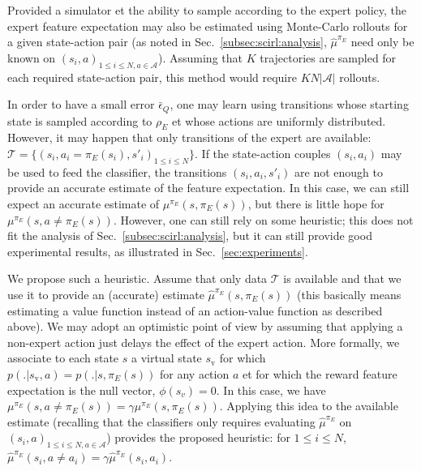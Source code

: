 \documentclass[english,utf8]{./hermes-journal}
\newcommand{\A}{\mathcal{A}}
\newcommand{\T}{\mathcal{T}}
\begin{document}
%
Provided a simulator et the ability to sample according to the
expert policy, the expert feature expectation may also be estimated
using Monte-Carlo rollouts for a given state-action pair (as noted
in Sec.~\ref{subsec:scirl:analysis}, $\hat{\mu}^{\pi_E}$ need only
be known on $(s_i,a)_{1\leq i\leq N,a\in\A}$). Assuming that $K$
trajectories are sampled for each required state-action pair, this
method would require $KN|\A|$ rollouts.

In order to have a small error $\bar{\epsilon}_Q$, one may learn
using transitions whose starting state is sampled according to
$\rho_E$ et whose actions are uniformly distributed. However, it
may happen that only transitions of the expert are available: $\T =
\{(s_i,a_i=\pi_E(s_i),s'_i)_{1\leq i \leq N}\}$. If the state-action
couples $(s_i,a_i)$ may be used to feed the classifier, the
transitions $(s_i,a_i,s'_i)$ are not enough to provide an accurate
estimate of the feature expectation. In this case, we can still
expect an accurate estimate of $\mu^{\pi_E}(s,\pi_E(s))$, but there
is little hope for $\mu^{\pi_E}(s,a\neq\pi_E(s))$. However, one can
still rely on some heuristic; this does not fit the analysis of
Sec.~\ref{subsec:scirl:analysis}, but it can still provide good
experimental results, as illustrated in Sec.~\ref{sec:experiments}.


We propose such a heuristic. Assume that only data $\T$ is available
and that we use it to provide an (accurate) estimate
$\hat{\mu}^{\pi_E}(s,\pi_E(s))$ (this basically means estimating a
value function instead of an action-value function as described
above). We may adopt an optimistic point of view by assuming that
applying a non-expert action just delays the effect of the expert
action. More formally, we associate to each state $s$ a virtual
state $s_\text{v}$ for which $p(.|s_\text{v},a)=p(.|s,\pi_E(s))$ for
any action $a$ et for which the reward feature expectation is the
null vector, $\phi(s_v) = 0$. In this case, we have
$\mu^{\pi_E}(s,a\neq\pi_E(s)) = \gamma \mu^{\pi_E}(s,\pi_E(s))$.
Applying this idea to the available estimate (recalling that the
classifiers only requires evaluating $\hat{\mu}^{\pi_E}$ on
$(s_i,a)_{1\leq i\leq N,a\in \A}$) provides the proposed heuristic:
for $1\leq i\leq N$, $\hat{\mu}^{\pi_E}(s_i,a\neq a_i) = \gamma
\hat{\mu}^{\pi_E}(s_i,a_i)$.
\end{document}
